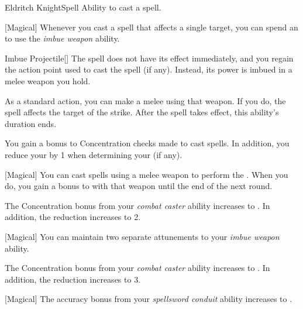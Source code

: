     \begin{feat}{Eldritch Knight}{Spell}
        \featpre Ability to cast a spell.

        [Magical] Whenever you cast a spell that affects a single target, you can spend an  to use the \textit{imbue weapon} ability.
        \begin{ability}{Imbue Projectile}[]
            The spell does not have its effect immediately, and you regain the action point used to cast the spell (if any).
            Instead, its power is imbued in a melee weapon you hold. 

            As a standard action, you can make a melee  using that weapon.
            If you do, the spell affects the target of the strike.
            After the spell takes effect, this ability's duration ends.
        \end{ability}

         You gain a  bonus to Concentration checks made to cast spells.
        In addition, you reduce your  by 1 when determining your  (if any).

        [Magical] You can cast spells using a melee weapon to perform the .
        When you do, you gain a  bonus to  with that weapon until the end of the next round.

         The Concentration bonus from your \textit{combat caster} ability increases to .
        In addition, the  reduction increases to 2.

        [Magical] You can maintain two separate attunements to your \textit{imbue weapon} ability.

         The Concentration bonus from your \textit{combat caster} ability increases to .
        In addition, the  reduction increases to 3.

        [Magical] The accuracy bonus from your \textit{spellsword conduit} ability increases to .
    \end{feat}


